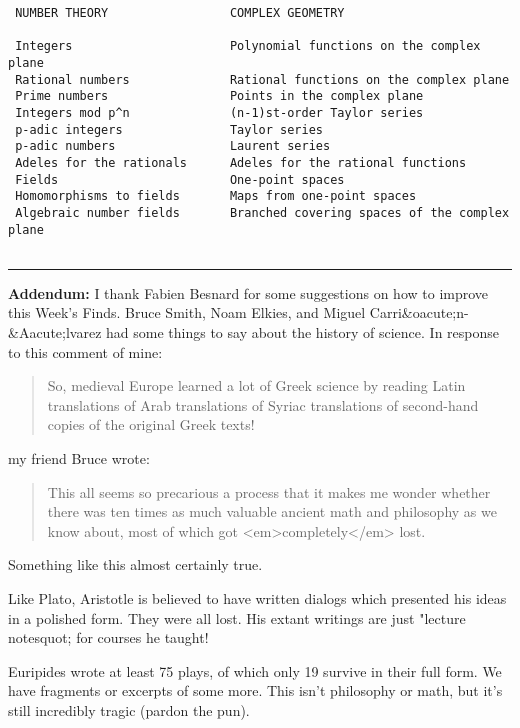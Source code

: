 \begin{verbatim}
 NUMBER THEORY                 COMPLEX GEOMETRY                                 

 Integers                      Polynomial functions on the complex plane
 Rational numbers              Rational functions on the complex plane
 Prime numbers                 Points in the complex plane            
 Integers mod p^n              (n-1)st-order Taylor series
 p-adic integers               Taylor series
 p-adic numbers                Laurent series
 Adeles for the rationals      Adeles for the rational functions
 Fields                        One-point spaces
 Homomorphisms to fields       Maps from one-point spaces
 Algebraic number fields       Branched covering spaces of the complex plane
                                       
\end{verbatim}
    

\par\noindent\rule{\textwidth}{0.4pt}
\textbf{Addendum:} 
I thank Fabien Besnard for some suggestions on how to improve
this Week's Finds.  
Bruce Smith, Noam Elkies, and 
Miguel Carri&oacute;n-&Aacute;lvarez 
had some things to say about 
the history of science.  In response to this comment of mine:

\begin{quote}
So, medieval Europe learned a lot of Greek science by reading Latin 
translations of Arab translations of Syriac translations of 
second-hand copies of the original Greek texts!
\end{quote}
    

my friend Bruce wrote:

\begin{quote}
This all seems so precarious a process that it makes me wonder whether
there was ten times as much valuable ancient math and philosophy as we
know about, most of which got <em>completely</em> lost.
\end{quote}
    

Something like this almost certainly true.  

Like Plato, Aristotle is believed to have written dialogs which presented 
his ideas in a polished form.  They were all lost.  His extant writings 
are just "lecture notesquot; for courses he taught!

Euripides wrote at least 75 plays, of which only 19 survive in their
full form.  We have fragments or excerpts of some more.  This isn't
philosophy or math, but it's still incredibly tragic (pardon the pun).

